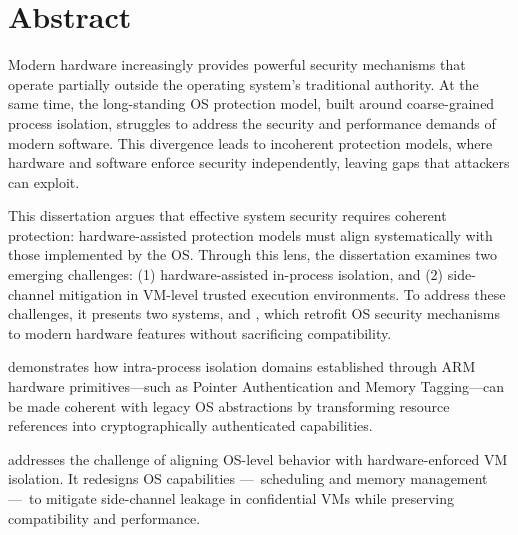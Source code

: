 \documentclass[a4paper,11pt]{report}
\DeclareRobustCommand\dash{---}
\begin{document}
\newpage

%


\newpage
%
\chapter*{Abstract}

Modern hardware increasingly provides powerful security mechanisms that operate partially outside the operating system’s traditional authority.
At the same time, the long-standing OS protection model, built around coarse-grained process isolation, struggles to address the security and performance demands of modern software.
This divergence leads to incoherent protection models, where hardware and software enforce security independently, leaving gaps that attackers can exploit.

This dissertation argues that effective system security requires coherent protection: hardware-assisted protection models must align systematically with those implemented by the OS.
Through this lens, the dissertation examines two emerging challenges: (1) hardware-assisted in-process isolation, and (2) side-channel mitigation in VM-level trusted execution environments.
To address these challenges, it presents two systems, \capacity and \incognitos, which retrofit OS security mechanisms to modern hardware features without sacrificing compatibility.

\capacity demonstrates how intra-process isolation domains established through ARM hardware primitives—such as Pointer Authentication and Memory Tagging—can be made coherent with legacy OS abstractions by transforming resource references into cryptographically authenticated capabilities.

\incognitos addresses the challenge of aligning OS-level behavior with hardware-enforced VM isolation.
It redesigns OS capabilities \dash\ scheduling and memory management \dash\ to mitigate side-channel leakage in confidential VMs while preserving compatibility and performance.
\end{document}
